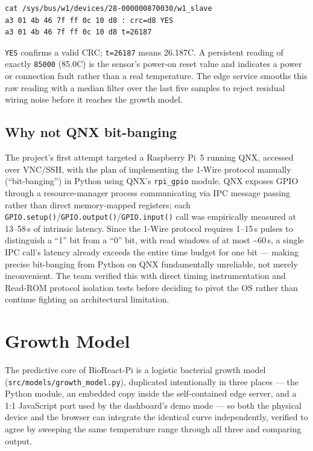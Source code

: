 \documentclass[11pt]{article}
\begin{document}
\begin{lstlisting}
cat /sys/bus/w1/devices/28-000000870030/w1_slave
a3 01 4b 46 7f ff 0c 10 d8 : crc=d8 YES
a3 01 4b 46 7f ff 0c 10 d8 t=26187
\end{lstlisting}

\texttt{YES} confirms a valid CRC; \texttt{t=26187} means 26.187\textdegree{}C. A persistent reading of exactly \texttt{85000} (85.0\textdegree{}C) is the sensor's power-on reset value and indicates a power or connection fault rather than a real temperature. The edge service smooths this raw reading with a median filter over the last five samples to reject residual wiring noise before it reaches the growth model.

\subsection{Why not QNX bit-banging}

The project's first attempt targeted a Raspberry Pi~5 running QNX, accessed over VNC/SSH, with the plan of implementing the 1-Wire protocol manually (``bit-banging'') in Python using QNX's \texttt{rpi\_gpio} module. QNX exposes GPIO through a resource-manager process communicating via IPC message passing rather than direct memory-mapped registers; each \texttt{GPIO.setup()}/\texttt{GPIO.output()}/\texttt{GPIO.input()} call was empirically measured at 13--58\,\textmu s of intrinsic latency. Since the 1-Wire protocol requires 1--15\,\textmu s pulses to distinguish a ``1'' bit from a ``0'' bit, with read windows of at most \textasciitilde60\,\textmu s, a single IPC call's latency already exceeds the entire time budget for one bit --- making precise bit-banging from Python on QNX fundamentally unreliable, not merely inconvenient. The team verified this with direct timing instrumentation and Read-ROM protocol isolation tests before deciding to pivot the OS rather than continue fighting an architectural limitation.

\section{Growth Model}

The predictive core of BioReact-Pi is a logistic bacterial growth model (\texttt{src/models/growth\_model.py}), duplicated intentionally in three places --- the Python module, an embedded copy inside the self-contained edge server, and a 1:1 JavaScript port used by the dashboard's demo mode --- so both the physical device and the browser can integrate the identical curve independently, verified to agree by sweeping the same temperature range through all three and comparing output.
\end{document}

